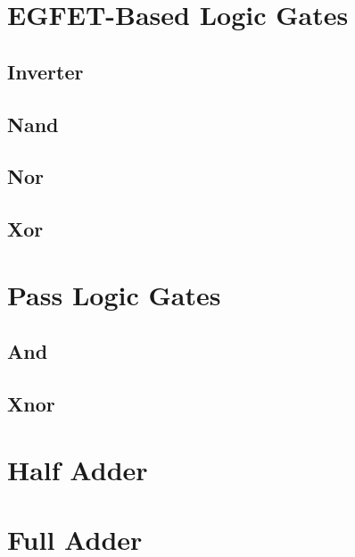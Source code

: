 \section{EGFET-Based Logic Gates}
\label{EGFET-Based Logic Gates}

\subsection{Inverter}
\label{Inverter}

\subsection{Nand}
\label{Nand}

\subsection{Nor}
\label{Nor}

\subsection{Xor}
\label{Xor}


\section{Pass Logic Gates}
\label{Pass Logic Gates}

\subsection{And}
\label{And}

\subsection{Xnor}
\label{Xnor}

\section{Half Adder}
\label{Half Adder}

\section{Full Adder}
\label{Full Adder}










